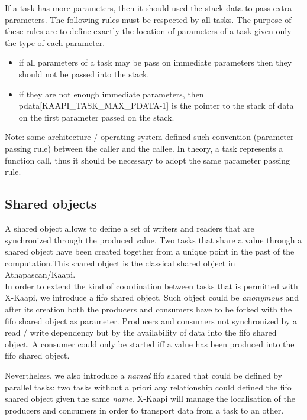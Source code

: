 \documentclass[12pt]{report}
\newcommand{\kaapi}{\textsc{X}-Kaapi\xspace}
\newcommand{\new}{}
\begin{document}
If a task has more parameters, then it should used the stack data to pass extra parameters. The following rules must be respected by all tasks. The purpose of these rules are to define exactly the location of parameters of a task given only the type
of each parameter.
\begin{itemize}
\item if all parameters of a task may be pass on immediate parameters then they should not be passed into the stack.
\item if they are not enough immediate parameters, then pdata[{\small KAAPI\_TASK\_MAX\_PDATA-1}] is the pointer to the stack of data on the first parameter passed on the stack.
\end{itemize}
Note: some architecture / operating system defined such convention (parameter passing rule) between the caller and the callee. In theory, a task represents a function call, thus it should be necessary to adopt the same parameter passing rule.


\subsection{Shared objects}
A shared object allows to define a set of writers and readers that are synchronized through the produced value.
Two tasks that share a value through a shared object have been created together from a unique point in the past of the computation.This shared object is the classical shared object in Athapascan/Kaapi.\\

\new
In order to extend the kind of coordination between tasks that is permitted with \kaapi, we introduce a fifo shared object. Such object could be \textit{anonymous} and after its creation both the producers and consumers have to be forked with the fifo shared object as parameter. Producers and consumers not synchronized by a read / write dependency but by the availability of data into the fifo shared object. A consumer could only be started iff a value has been produced into the fifo shared object.

Nevertheless, we also introduce a \textit{named} fifo shared that could be defined by parallel tasks: two tasks without a priori any relationship could defined the fifo shared object given the same \textit{name}. \kaapi will manage the localisation of the producers and concumers in order to transport data from a task to an other.
\end{document}

